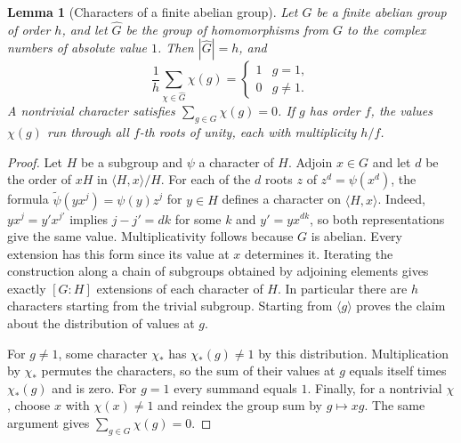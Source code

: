 \documentclass[11pt,oneside,openany]{book}
\theoremstyle{plain}
\newtheorem{lemma}[theorem]{Lemma}
\theoremstyle{definition}
\theoremstyle{remark}
\begin{document}
\begin{lemma}[Characters of a finite abelian group]
\label{lem:nt-dirichlet-characters}
Let \(G\) be a finite abelian group of order \(h\), and let
\(\widehat G\) be the group of homomorphisms from \(G\) to the
complex numbers of absolute value \(1\). Then \(|\widehat G|=h\),
and
\[
 \frac1h\sum_{\chi\in\widehat G}\chi(g)
  =\begin{cases}1&g=1,\\0&g\ne1.\end{cases}
\]
A nontrivial character satisfies \(\sum_{g\in G}\chi(g)=0\).
If \(g\) has order \(f\), the values \(\chi(g)\) run through all
\(f\)-th roots of unity, each with multiplicity \(h/f\).
\end{lemma}
\begin{proof}
Let \(H\) be a subgroup and \(\psi\) a character of \(H\).
Adjoin \(x\in G\) and let \(d\) be the order of \(xH\) in
\(\langle H,x\rangle/H\). For each of the \(d\) roots \(z\) of
\(z^d=\psi(x^d)\), the formula
\(\widetilde\psi(yx^j)=\psi(y)z^j\) for \(y\in H\) defines a
character on \(\langle H,x\rangle\).
Indeed, \(yx^j=y'x^{j'}\) implies \(j-j'=dk\) for some \(k\)
and \(y'=yx^{dk}\), so both representations give the same value.
Multiplicativity follows because \(G\) is abelian. Every extension
has this form since its value at \(x\) determines it. Iterating
the construction along a chain of subgroups obtained by adjoining
elements gives exactly \([G:H]\) extensions of each character of
\(H\). In particular there are \(h\) characters starting from the
trivial subgroup. Starting from \(\langle g\rangle\) proves the
claim about the distribution of values at \(g\).

For \(g\ne1\), some character \(\chi_*\) has \(\chi_*(g)\ne1\)
by this distribution. Multiplication by \(\chi_*\) permutes the
characters, so the sum of their values at \(g\) equals itself
times \(\chi_*(g)\) and is zero. For \(g=1\) every summand equals
\(1\). Finally, for a nontrivial \(\chi\), choose \(x\) with
\(\chi(x)\ne1\) and reindex the group sum by \(g\mapsto xg\).
The same argument gives \(\sum_{g\in G}\chi(g)=0\).
\end{proof}
\end{document}
